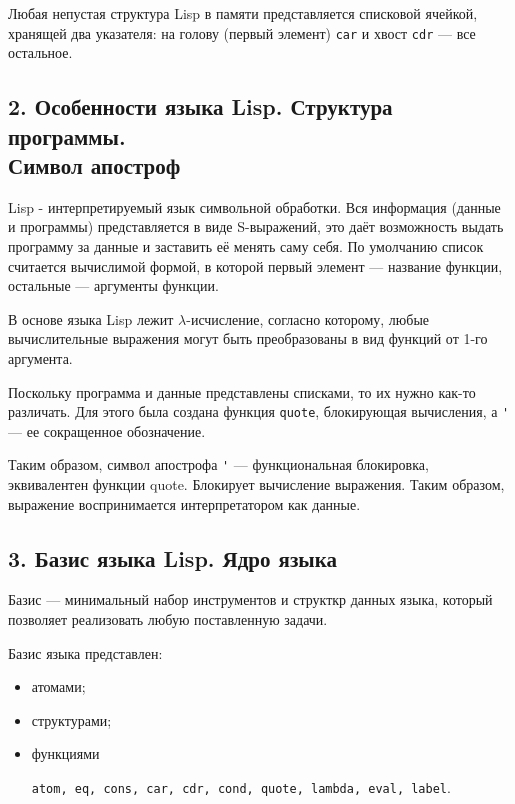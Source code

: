 Любая непустая структура Lisp в памяти представляется списковой
ячейкой, хранящей два указателя: на голову (первый элемент) \verb|car| и
хвост \verb|cdr| --- все остальное.

\begin{figure}[h]
    \centering
    \def\svgwidth{0.8\textwidth}
    
\end{figure}

\subsection*{2. Особенности языка Lisp. Структура программы.\\Символ апостроф}

Lisp - интерпретируемый язык символьной обработки. Вся информация (данные и
программы) представляется в виде S-выражений, это даёт возможность выдать
программу за данные и заставить её менять саму себя. По умолчанию список
считается вычислимой формой, в которой первый элемент --- название функции,
остальные --- аргументы функции.

В основе языка Lisp лежит $\lambda$-исчисление, согласно которому, любые
вычислительные выражения могут быть преобразованы в вид функций от 1-го
аргумента.

Поскольку программа и данные представлены списками, то их нужно как-то различать. 
Для этого была создана функция \verb|quote|, блокирующая вычисления, а \verb|'|
--- ее сокращенное обозначение. 

Таким образом, символ апострофа \verb|'| --- функциональная блокировка,
эквивалентен функции quote. Блокирует вычисление выражения. Таким образом,
выражение воспринимается интерпретатором как данные.

\subsection*{3. Базис языка Lisp. Ядро языка}

Базис --- минимальный набор инструментов и структкр данных языка, который
позволяет реализовать любую поставленную задачи.

Базис языка представлен:
\begin{itemize}
    \item атомами;
    \item структурами;
    \item функциями

    \verb|atom, eq, cons, car, cdr, cond, quote, lambda, eval, label|.
\end{itemize}

